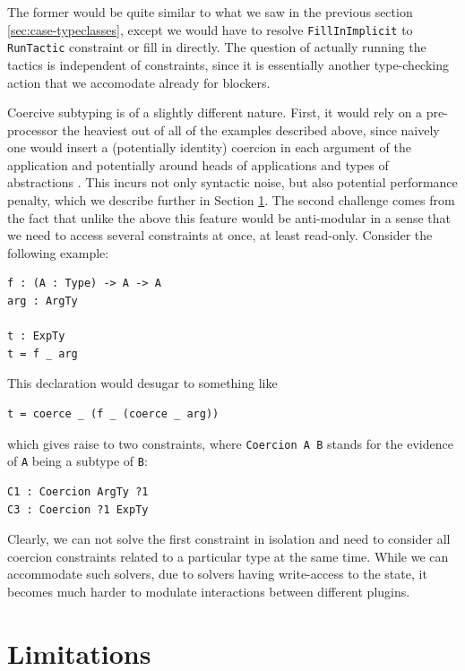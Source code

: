 \documentclass[
  sigconf,
  screen,
  review]{acmart}
\begin{document}
The former would be quite similar to what we saw in the previous section
\ref{sec:case-typeclasses}, except we would have to resolve
\texttt{FillInImplicit} to \texttt{RunTactic} constraint or fill in
directly. The question of actually running the tactics is independent of
constraints, since it is essentially another type-checking action that
we accomodate already for blockers.

Coercive subtyping is of a slightly different nature. First, it would
rely on a pre-processor the heaviest out of all of the examples
described above, since naively one would insert a (potentially identity)
coercion in each argument of the application and potentially around
heads of applications and types of abstractions
\citep{tassiBiDirectionalRefinementAlgorithm2012}. This incurs not only
syntactic noise, but also potential performance penalty, which we
describe further in Section \ref{sec:limitations}. The second challenge
comes from the fact that unlike the above this feature would be
anti-modular in a sense that we need to access several constraints at
once, at least read-only. Consider the following example:

\begin{verbatim}
f : (A : Type) -> A -> A
arg : ArgTy

t : ExpTy
t = f _ arg
\end{verbatim}

This declaration would desugar to something like

\begin{verbatim}
t = coerce _ (f _ (coerce _ arg))
\end{verbatim}

which gives raise to two constraints, where \texttt{Coercion\ A\ B}
stands for the evidence of \texttt{A} being a subtype of \texttt{B}:

\begin{verbatim}
C1 : Coercion ArgTy ?1
C3 : Coercion ?1 ExpTy
\end{verbatim}

Clearly, we can not solve the first constraint in isolation and need to
consider all coercion constraints related to a particular type at the
same time. While we can accommodate such solvers, due to solvers having
write-access to the state, it becomes much harder to modulate
interactions between different plugins.

\hypertarget{sec:limitations}{%
\section{Limitations}\label{sec:limitations}}
\end{document}
